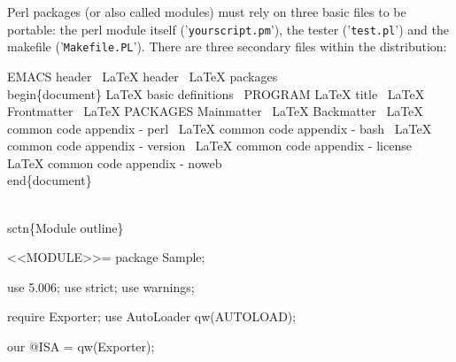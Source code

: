 \documentclass[11pt]{article}
\def\nwendcode{\endtrivlist \endgroup} %
\let\nwdocspar=\par                    %
\begin{document}

Perl packages (or also called modules) must rely on three basic files to be portable: the perl module itself ('{\tt{}your{}script.pm}'), the tester ('{\tt{}test.pl}') and the makefile ('{\tt{}Makefile.PL}'). There are three secondary files within the distribution: 

\nwenddocs{}\endmoddef
\LA{}EMACS header~{\nwtagstyle{}}\RA{}
\LA{}LaTeX header~{\nwtagstyle{}}\RA{}
\LA{}LaTeX packages~{\nwtagstyle{}}\RA{}
%
%
\\begin\{document\}
%
\LA{}LaTeX basic definitions~{\nwtagstyle{}}\RA{}
\LA{}PROGRAM LaTeX title~{\nwtagstyle{}}\RA{}
%
\LA{}LaTeX Frontmatter~{\nwtagstyle{}}\RA{}
\LA{}LaTeX PACKAGES Mainmatter~{\nwtagstyle{}}\RA{}
\LA{}LaTeX Backmatter~{\nwtagstyle{}}\RA{}
%
\LA{}LaTeX common code appendix - perl~{\nwtagstyle{}}\RA{}
\LA{}LaTeX common code appendix - bash~{\nwtagstyle{}}\RA{}
\LA{}LaTeX common code appendix - version~{\nwtagstyle{}}\RA{}
\LA{}LaTeX common code appendix - license~{\nwtagstyle{}}\RA{}
\LA{}LaTeX common code appendix - noweb~{\nwtagstyle{}}\RA{}
%
\\end\{document\}
%
\nwendcode{}\nwdocspar

\nwenddocs{}\endmoddef
\\sctn\{Module outline\}

<<MODULE>>=
package Sample;

use 5.006;
use strict;
use warnings;

require Exporter;
use AutoLoader qw(AUTOLOAD);

our @ISA = qw(Exporter);
\end{document}
